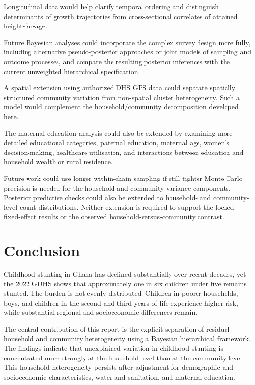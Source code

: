Longitudinal data would help clarify temporal ordering and distinguish determinants of growth trajectories from cross-sectional correlates of attained height-for-age.

Future Bayesian analyses could incorporate the complex survey design more fully, including alternative pseudo-posterior approaches or joint models of sampling and outcome processes, and compare the resulting posterior inferences with the current unweighted hierarchical specification.

A spatial extension using authorized DHS GPS data could separate spatially structured community variation from non-spatial cluster heterogeneity. Such a model would complement the household/community decomposition developed here.

The maternal-education analysis could also be extended by examining more detailed educational categories, paternal education, maternal age, women's decision-making, healthcare utilisation, and interactions between education and household wealth or rural residence.

Future work could use longer within-chain sampling if still tighter Monte Carlo precision is needed for the household and community variance components. Posterior predictive checks could also be extended to household- and community-level count distributions. Neither extension is required to support the locked fixed-effect results or the observed household-versus-community contrast.

\section{Conclusion}

Childhood stunting in Ghana has declined substantially over recent decades, yet the 2022 GDHS shows that approximately one in six children under five remains stunted. The burden is not evenly distributed. Children in poorer households, boys, and children in the second and third years of life experience higher risk, while substantial regional and socioeconomic differences remain.

The central contribution of this report is the explicit separation of residual household and community heterogeneity using a Bayesian hierarchical framework. The findings indicate that unexplained variation in childhood stunting is concentrated more strongly at the household level than at the community level. This household heterogeneity persists after adjustment for demographic and socioeconomic characteristics, water and sanitation, and maternal education.

